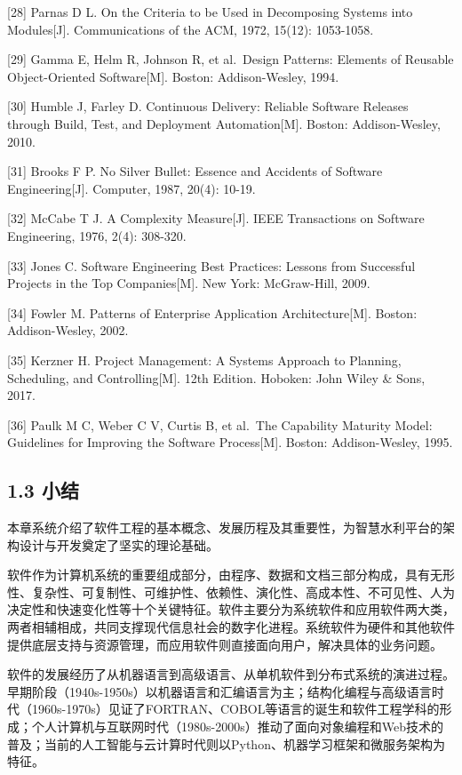 {[}28{]} Parnas D L. On the Criteria to be Used in Decomposing Systems into Modules{[}J{]}. Communications of the ACM, 1972, 15(12): 1053-1058.

{[}29{]} Gamma E, Helm R, Johnson R, et al.~Design Patterns: Elements of Reusable Object-Oriented Software{[}M{]}. Boston: Addison-Wesley, 1994.

{[}30{]} Humble J, Farley D. Continuous Delivery: Reliable Software Releases through Build, Test, and Deployment Automation{[}M{]}. Boston: Addison-Wesley, 2010.

{[}31{]} Brooks F P. No Silver Bullet: Essence and Accidents of Software Engineering{[}J{]}. Computer, 1987, 20(4): 10-19.

{[}32{]} McCabe T J. A Complexity Measure{[}J{]}. IEEE Transactions on Software Engineering, 1976, 2(4): 308-320.

{[}33{]} Jones C. Software Engineering Best Practices: Lessons from Successful Projects in the Top Companies{[}M{]}. New York: McGraw-Hill, 2009.

{[}34{]} Fowler M. Patterns of Enterprise Application Architecture{[}M{]}. Boston: Addison-Wesley, 2002.

{[}35{]} Kerzner H. Project Management: A Systems Approach to Planning, Scheduling, and Controlling{[}M{]}. 12th Edition. Hoboken: John Wiley \& Sons, 2017.

{[}36{]} Paulk M C, Weber C V, Curtis B, et al.~The Capability Maturity Model: Guidelines for Improving the Software Process{[}M{]}. Boston: Addison-Wesley, 1995.

\subsection{1.3 小结}\label{ux5c0fux7ed3}

本章系统介绍了软件工程的基本概念、发展历程及其重要性，为智慧水利平台的架构设计与开发奠定了坚实的理论基础。

软件作为计算机系统的重要组成部分，由程序、数据和文档三部分构成，具有无形性、复杂性、可复制性、可维护性、依赖性、演化性、高成本性、不可见性、人为决定性和快速变化性等十个关键特征。软件主要分为系统软件和应用软件两大类，两者相辅相成，共同支撑现代信息社会的数字化进程。系统软件为硬件和其他软件提供底层支持与资源管理，而应用软件则直接面向用户，解决具体的业务问题。

软件的发展经历了从机器语言到高级语言、从单机软件到分布式系统的演进过程。早期阶段（1940s-1950s）以机器语言和汇编语言为主；结构化编程与高级语言时代（1960s-1970s）见证了FORTRAN、COBOL等语言的诞生和软件工程学科的形成；个人计算机与互联网时代（1980s-2000s）推动了面向对象编程和Web技术的普及；当前的人工智能与云计算时代则以Python、机器学习框架和微服务架构为特征。

